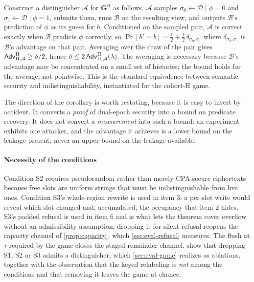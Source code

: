 Construct a distinguisher $\mathcal{A}$ for $\mathbf{G}^{\mathrm{H}}$ as follows. $\mathcal{A}$
samples $\sigma_0 \leftarrow \mathcal{D} \mid \phi = 0$ and $\sigma_1 \leftarrow \mathcal{D} \mid
\phi = 1$, submits them, runs $\mathcal{B}$ on the resulting view, and outputs $\mathcal{B}$'s
prediction of $\phi$ as its guess for $b$. Conditioned on the sampled pair, $\mathcal{A}$ is correct
exactly when $\mathcal{B}$ predicts $\phi$ correctly, so
$\Pr[b' = b] = \tfrac{1}{2} + \tfrac{1}{2}\,\delta_{\sigma_0,\sigma_1}$ where
$\delta_{\sigma_0,\sigma_1}$ is $\mathcal{B}$'s advantage on that pair. Averaging over the draw of
the pair gives $\mathsf{Adv}^{\mathrm{H}}_{\Pi,\mathcal{A}} \ge \delta/2$, hence
$\delta \le 2\,\mathsf{Adv}^{\mathrm{H}}_{\Pi,\mathcal{A}}(\lambda)$. The averaging is necessary because $\mathcal{B}$'s
advantage may be concentrated on a small set of histories; the bound holds for the average, not
pointwise. This is the standard equivalence between semantic security and indistinguishability,
instantiated for the cohort-H game.

The direction of the corollary is worth restating, because it is easy to invert by accident. It
converts a \emph{proof} of dual-epoch security into a bound on predicate recovery. It does not
convert a \emph{measurement} into such a bound: an experiment exhibits one attacker, and the
advantage it achieves is a lower bound on the leakage present, never an upper bound on the leakage
available.

\paragraph{Necessity of the conditions} Condition S2 requires pseudorandom rather than merely
CPA-secure ciphertexts because free slots are uniform strings that must be indistinguishable from
live ones. Condition S3's whole-region rewrite is used in item 3: a per-slot write would reveal
which slot changed and, accumulated, the occupancy that item 2 hides. S3's padded refusal is used in
item 6 and is what lets the theorem cover overflow without an admissibility assumption; dropping it
for silent refusal reopens the capacity channel of \cref{prop:capacity}, which
\cref{sec:eval-refusal} measures. The flush at $\tau$ required by the game closes the
staged-remainder channel.  show that dropping S1, S2 or S3 admits a
distinguisher, which \cref{sec:eval-game} realizes as ablations, together with the observation that
the keyed relabeling is \emph{not} among the conditions and that removing it leaves the game at
chance.

